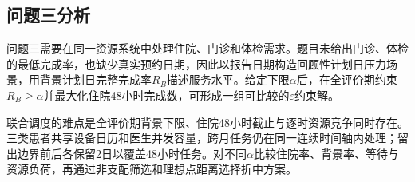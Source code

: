 \subsection{问题三分析}

问题三需要在同一资源系统中处理住院、门诊和体检需求。题目未给出门诊、体检的最低完成率，也缺少真实预约日期，因此以报告日期构造回顾性计划日压力场景，用背景计划日完整完成率$R_B$描述服务水平。给定下限$\alpha$后，在全评价期约束$R_B\ge\alpha$并最大化住院48小时完成数，可形成一组可比较的$\varepsilon$约束解。

联合调度的难点是全评价期背景下限、住院48小时截止与逐时资源竞争同时存在。三类患者共享设备日历和医生并发容量，跨月任务仍在同一连续时间轴内处理；留出边界前后各保留2日以覆盖48小时任务。对不同$\alpha$比较住院率、背景率、等待与资源负荷，再通过非支配筛选和理想点距离选择折中方案。
